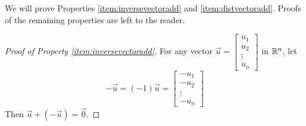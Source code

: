 \documentclass{ximera}
\begin{document}
We will prove Properties \ref{item:inversevectoradd} and \ref{item:distvectoradd}.  Proofs of the remaining properties are left to the reader.
\begin{proof}[Proof of Property \ref{item:inversevectoradd}]
For any vector $\vec{u}=\begin{bmatrix}
u_1\\
u_2\\
\vdots\\
u_n
\end{bmatrix}$ in $\mathbb{R}^n$, let $$-\vec{u}=(-1)\vec{u}=\begin{bmatrix}
-u_1\\
-u_2\\
\vdots\\
-u_n
\end{bmatrix}$$
Then $\vec{u}+(-\vec{u})=\vec{0}$.
\end{proof}
\end{document}
